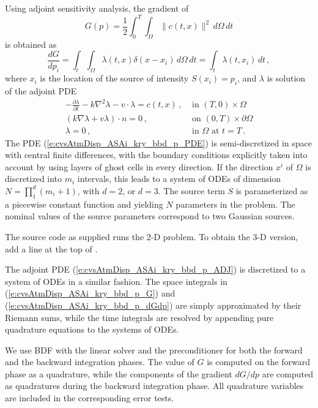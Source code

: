 Using adjoint sensitivity analysis, the gradient of
\begin{equation}\label{e:cvsAtmDisp_ASAi_kry_bbd_p_G}
  G(p) = \frac{1}{2} \int_0^T \int_\Omega \| c(t,x) \|^2 \, d\Omega \, dt
\end{equation}
is obtained as
\begin{equation}\label{e:cvsAtmDisp_ASAi_kry_bbd_p_dGdp}
  \frac{dG}{dp_i} = \int_t \int_\Omega \lambda(t,x) \delta(x-x_i) \, d\Omega \, dt
  = \int_t \lambda(t,x_i) \, dt \, ,
\end{equation}
where $x_i$ is the location of the source of intensity $S(x_i)=p_i$, and $\lambda$
is solution of the adjoint PDE
\begin{equation}\label{e:cvsAtmDisp_ASAi_kry_bbd_p_ADJ}
  \begin{split}
    - \frac{\partial\lambda}{\partial t} - k \nabla^2\lambda - v \cdot \lambda = c(t,x)  \, ,
    &\text{ in } (T,0) \times \Omega \\
    (k \nabla\lambda + v \lambda) \cdot n = 0 \, ,
    &\text{ on } (0,T) \times \partial\Omega \\
    \lambda = 0 \, ,
    &\text{ in } \Omega \text{ at } t = T \, .
  \end{split}
\end{equation}
The PDE (\ref{e:cvsAtmDisp_ASAi_kry_bbd_p_PDE}) is semi-discretized in space with 
central finite differences, with the boundary conditions explicitly taken into account 
by using layers of ghost cells in every direction. If the direction $x^i$ of $\Omega$
is discretized into $m_i$ intervals, this leads to a system of ODEs of dimension 
$N = \prod_1^d (m_i+1)$, with $d=2$, or $d=3$.
The source term $S$ is parameterized as a piecewise constant function and yielding
$N$ parameters in the problem. The nominal values of the source parameters correspond
to two Gaussian sources.

The source code as supplied runs the 2-D problem.  To obtain the 3-D version,
add a line  at the top of .

The adjoint PDE (\ref{e:cvsAtmDisp_ASAi_kry_bbd_p_ADJ}) is discretized to a system of
ODEs in a similar fashion.  The space integrals in (\ref{e:cvsAtmDisp_ASAi_kry_bbd_p_G})
and (\ref{e:cvsAtmDisp_ASAi_kry_bbd_p_dGdp}) are simply approximated by their
Riemann sums, while the time integrals are resolved by appending pure quadrature
equations to the systems of ODEs.

We use BDF with the {\cvspgmr} linear solver and the {\cvbbdpre} preconditioner for
both the forward and the backward integration phases. The value of $G$ is computed
on the forward phase as a quadrature, while the components of the gradient $dG/dp$
are computed as quadratures during the backward integration phase.  All quadrature
variables are included in the corresponding error tests.

